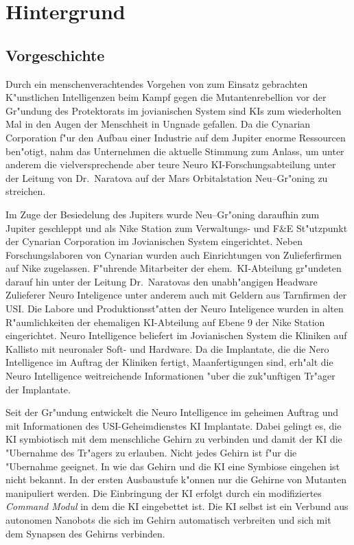 \section{Hintergrund}

\subsection{Vorgeschichte}

Durch ein menschenverachtendes Vorgehen von zum Einsatz gebrachten K"unstlichen Intelligenzen beim Kampf gegen die Mutantenrebellion vor der Gr"undung des Protektorats im jovianischen System sind KIs zum wiederholten Mal in den Augen der Menschheit in Ungnade gefallen. Da die Cynarian Corporation f"ur den Aufbau einer Industrie auf dem Jupiter enorme Ressourcen ben"otigt, nahm das Unternehmen die aktuelle Stimmung zum Anlass, um unter anderem die vielversprechende aber teure Neuro KI-Forschungsabteilung unter der Leitung von Dr.~Naratova auf der Mars Orbitalstation Neu--Gr"oning zu streichen.

Im Zuge der Besiedelung des Jupiters wurde Neu--Gr"oning daraufhin zum Jupiter geschleppt und als Nike Station zum Verwaltungs- und F\&E St"utzpunkt der Cynarian Corporation im Jovianischen System eingerichtet. Neben Forschungslaboren von Cynarian wurden auch Einrichtungen von Zulieferfirmen auf Nike zugelassen. F"uhrende Mitarbeiter der ehem.~KI-Abteilung gr"undeten darauf hin unter der Leitung Dr.~Naratovas den unabh"angigen Headware Zulieferer Neuro Inteligence unter anderem auch mit Geldern aus Tarnfirmen der USI. Die Labore und Produktionsst"atten der Neuro Inteligence wurden in alten R"aumlichkeiten der ehemaligen KI-Abteilung auf Ebene 9 der Nike Station eingerichtet. Neuro Intelligence beliefert im Jovianischen System die Kliniken auf Kallisto mit neuronaler Soft- und Hardware. Da die Implantate, die die Nero Intelligence im Auftrag der Kliniken fertigt, Ma\3anfertigungen sind, erh"alt die Neuro Intelligence weitreichende Informationen "uber die zuk"unftigen Tr"ager der Implantate.

Seit der Gr"undung entwickelt die Neuro Intelligence im geheimen Auftrag und mit Informationen des USI-Geheimdienstes KI Implantate. Dabei gelingt es, die KI symbiotisch mit dem menschliche Gehirn zu verbinden und damit der KI die "Ubernahme des Tr"agers zu erlauben. Nicht jedes Gehirn ist f"ur die "Ubernahme geeignet. In wie das Gehirn und die KI eine Symbiose eingehen ist nicht bekannt. In der ersten Ausbaustufe k"onnen nur die Gehirne von Mutanten manipuliert werden. Die Einbringung der KI erfolgt durch ein modifiziertes \emph{Command Modul} in dem die KI eingebettet ist. Die KI selbst ist ein Verbund aus autonomen Nanobots die sich im Gehirn automatisch verbreiten und sich mit dem Synapsen des Gehirns verbinden.

